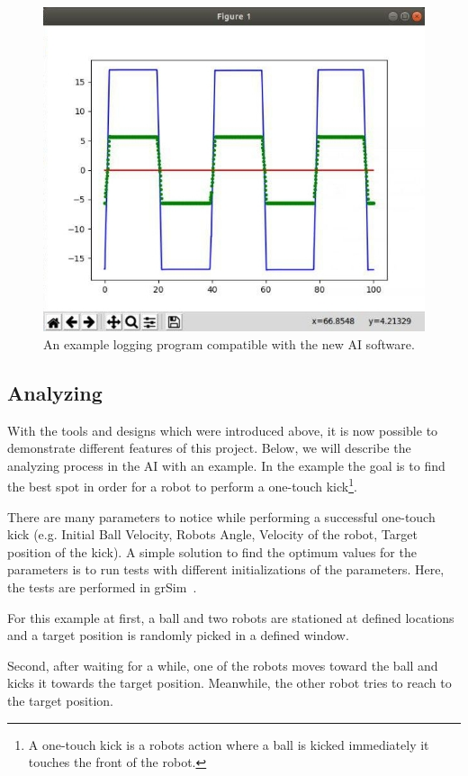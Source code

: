 \documentclass[runningheads]{llncs}
\begin{document}
\begin{figure}
\includegraphics[width=\textwidth]{images/plotter.jpg}
\caption{An example logging program compatible with the new AI software.} \label{fig1_plotter}
\end{figure}

\subsection{Analyzing}
With the tools and designs which were introduced above, it is now possible to demonstrate different features of this project. Below, we will describe the analyzing process in the AI with an example. In the example the goal is to find the best spot in order for a robot to perform a one-touch kick\footnote{A one-touch kick is a robots action where a ball is kicked immediately it touches the front of the robot.}.

There are many parameters to notice while performing a successful one-touch kick (e.g. Initial Ball Velocity, Robots Angle, Velocity of the robot, Target position of the kick). A simple solution to find the optimum values for the parameters is to run tests with different initializations of the parameters. Here, the tests are performed in grSim~\cite{ref_grsim}.

For this example at first, a ball and two robots are stationed at defined locations and a target position is randomly picked in a defined window.

Second, after waiting for a while, one of the robots moves toward the ball and kicks it towards the target position. Meanwhile, the other robot tries to reach to the target position.
\end{document}

